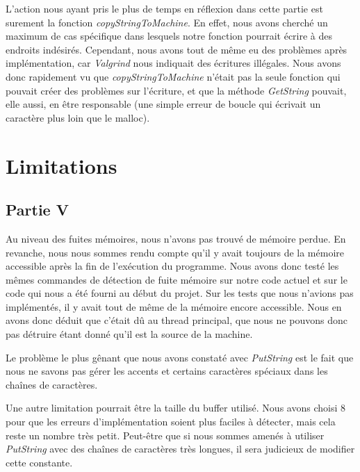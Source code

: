\documentclass{article}
\begin{document}
    L'action nous ayant pris le plus de temps en réflexion dans cette partie est
    surement la fonction \textit{copyStringToMachine}. En effet, nous avons cherché
    un maximum de cas spécifique dans lesquels notre fonction pourrait écrire à des
    endroits indésirés. Cependant, nous avons tout de même eu des problèmes après
    implémentation, car \textit{Valgrind} nous indiquait des écritures illégales.
    Nous avons donc rapidement vu que \textit{copyStringToMachine} n'était pas la
    seule fonction qui pouvait créer des problèmes sur l'écriture, et que la
    méthode \textit{GetString} pouvait, elle aussi, en être responsable (une simple
    erreur de boucle qui écrivait un caractère plus loin que le malloc).

\section{Limitations}
    \subsection{Partie V}
    Au niveau des fuites mémoires, nous n'avons pas trouvé de mémoire perdue. En
    revanche, nous nous sommes rendu compte qu'il y avait toujours de la mémoire
    accessible après la fin de l'exécution du programme. Nous avons donc testé les
    mêmes commandes de détection de fuite mémoire sur notre code actuel et sur le
    code qui nous a été fourni au début du projet. Sur les tests que nous n'avions
    pas implémentés, il y avait tout de même de la mémoire encore accessible. Nous
    en avons donc déduit que c'était dû au thread principal, que nous ne pouvons
    donc pas détruire étant donné qu'il est la source de la machine.

    Le problème le plus gênant que nous avons constaté avec \textit{PutString} est le fait
    que nous ne savons pas gérer les accents et certains caractères spéciaux dans
    les chaînes de caractères.

    Une autre limitation pourrait être la taille du buffer utilisé. Nous avons
    choisi 8 pour que les erreurs d'implémentation soient plus faciles à détecter,
    mais cela reste un nombre très petit. Peut-être que si nous sommes amenés à
    utiliser \textit{PutString} avec des chaînes de caractères très longues, il sera
    judicieux de modifier cette constante.
\end{document}
